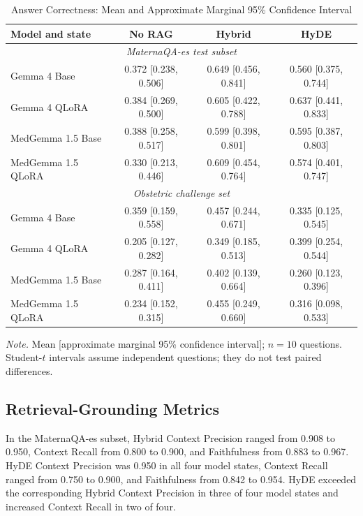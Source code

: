 \begin{table}[t]
\footnotesize
\centering
\begin{threeparttable}
\caption{Answer Correctness: Mean and Approximate Marginal 95\% Confidence
Interval}
\label{tab:correctness-ci}
\begin{tabular*}{\textwidth}{@{\extracolsep{\fill}}lccc@{}}
\toprule
\textbf{Model and state} & \textbf{No RAG} & \textbf{Hybrid} & \textbf{HyDE} \\
\midrule
\multicolumn{4}{c}{\textit{MaternaQA-es test subset}} \\
\midrule
Gemma 4 Base        & 0.372 [0.238, 0.506] & 0.649 [0.456, 0.841] & 0.560 [0.375, 0.744] \\
Gemma 4 QLoRA       & 0.384 [0.269, 0.500] & 0.605 [0.422, 0.788] & 0.637 [0.441, 0.833] \\
MedGemma 1.5 Base   & 0.388 [0.258, 0.517] & 0.599 [0.398, 0.801] & 0.595 [0.387, 0.803] \\
MedGemma 1.5 QLoRA  & 0.330 [0.213, 0.446] & 0.609 [0.454, 0.764] & 0.574 [0.401, 0.747] \\
\midrule
\multicolumn{4}{c}{\textit{Obstetric challenge set}} \\
\midrule
Gemma 4 Base        & 0.359 [0.159, 0.558] & 0.457 [0.244, 0.671] & 0.335 [0.125, 0.545] \\
Gemma 4 QLoRA       & 0.205 [0.127, 0.282] & 0.349 [0.185, 0.513] & 0.399 [0.254, 0.544] \\
MedGemma 1.5 Base   & 0.287 [0.164, 0.411] & 0.402 [0.139, 0.664] & 0.260 [0.123, 0.396] \\
MedGemma 1.5 QLoRA  & 0.234 [0.152, 0.315] & 0.455 [0.249, 0.660] & 0.316 [0.098, 0.533] \\
\bottomrule
\end{tabular*}
\begin{tablenotes}[flushleft]
\item[] \textit{Note.} Mean [approximate marginal 95\% confidence interval];
$n = 10$ questions. Student-$t$ intervals
assume independent questions; they do not test paired differences.
\end{tablenotes}
\end{threeparttable}
\end{table}

\subsection{Retrieval-Grounding Metrics}
In the MaternaQA-es subset, Hybrid Context Precision ranged from 0.908 to
0.950, Context Recall from 0.800 to 0.900, and Faithfulness from 0.883 to
0.967. HyDE Context Precision was 0.950 in all four model states, Context
Recall ranged from 0.750 to 0.900, and Faithfulness from 0.842 to 0.954.
HyDE exceeded the corresponding Hybrid Context Precision in three of four
model states and increased Context Recall in two of four.

